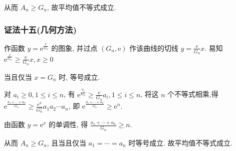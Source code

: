 从而 $A_{n} \geqslant G_{n}$, 故平均值不等式成立.

\subsubsection*{证法十五(几何方法)}

作函数 $y=\mathrm{e}^{\frac{x}{G_{n}}}$ 的图象, 并过点 $\left(G_{n}, \mathrm{e}\right)$ 作该曲线的切线 $y=\frac{\mathrm{e}}{G_{n}} x$. 易知 $\mathrm{e}^{\frac{x}{G_{n}}} \geqslant \frac{\mathrm{e}}{G_{n}} x, x \geqslant 0$

当且仅当 $x=G_{n}$ 时, 等号成立.

对 $a_{i} \geqslant 0,1 \leqslant i \leqslant n$, 有 $\mathrm{e}^{\frac{a_{i}}{G_{n}}} \geqslant \frac{\mathrm{e}}{G_{n}} a_{i}, 1 \leqslant i \leqslant n$, 将这 $n$ 个不等式相乘,得 $\mathrm{e}^{\frac{a_{1}+\cdots+a_{n}}{G_{n}}} \geqslant \frac{\mathrm{e}^{n}}{G_{n}^{n}} a_{1} a_{2} \cdots a_{n}$, 即 $\mathrm{e}^{\frac{a_{1}+\cdots+a_{n}}{G_{n}}} \geqslant \mathrm{e}^{n}$.

由函数 $y=\mathrm{e}^{x}$ 的单调性, 得 $\frac{a_{1}+\cdots+a_{n}}{G_{n}} \geqslant n$.

从而 $A_{n} \geqslant G_{n}$, 且当且仅当 $a_{1}=\cdots=a_{n}$ 时等号成立. 故平均值不等式成立.

